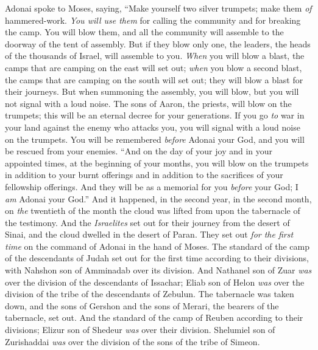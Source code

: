 \begin{biblechapter} %
 Adonai spoke to Moses, saying,
\verse “Make yourself two silver trumpets; make them \textit{of} hammered-work. \textit{You will use them} for calling the community and for breaking the camp.
\verse You will blow them, and all the community will assemble to the doorway of the tent of assembly.
\verse But if they blow only one, the leaders, the heads of the thousands of Israel, will assemble to you.
\verse \textit{When} you will blow a blast, the camps that are camping on the east will set out;
\verse \textit{when} you blow a second blast, the camps that are camping on the south will set out; they will blow a blast for their journeys.
\verse But when summoning the assembly, you will blow, but you will not signal with a loud noise.
\verse The sons of Aaron, the priests, will blow on the trumpets; this will be an eternal decree for your generations.
\verse If you go \textit{to} war in your land against the enemy who attacks you, you will signal with a loud noise on the trumpets. You will be remembered \textit{before} Adonai your God, and you will be rescued from your enemies.
\verse “And on the day of your joy and in your appointed times, at the beginning of your months, you will blow on the trumpets in addition to your burnt offerings and in addition to the sacrifices of your fellowship offerings. And they will be as a memorial for you \textit{before} your God; I \textit{am} Adonai your God.”
 And it happened, in the second year, in the second month, on \textit{the} twentieth of the month the cloud was lifted from upon the tabernacle of the testimony.
\verse And the \textit{Israelites} set out for their journey from the desert of Sinai, and the cloud dwelled in the desert of Paran.
\verse They set out \textit{for the first time} on the command of Adonai in the hand of Moses.
\verse The standard of the camp of the descendants of Judah set out for the first time according to their divisions, with Nahshon son of Amminadab over its division.
\verse And Nathanel son of Zuar \textit{was} over the division of the descendants of Issachar;
\verse Eliab son of Helon \textit{was} over the division of the tribe of the descendants of Zebulun.
\verse The tabernacle was taken down, and the sons of Gershon and the sons of Merari, the bearers of the tabernacle, set out.
\verse And the standard of the camp of Reuben according to their divisions; Elizur son of Shedeur \textit{was} over their division.
\verse Shelumiel son of Zurishaddai \textit{was} over the division of the sons of the tribe of Simeon.

\end{biblechapter}
